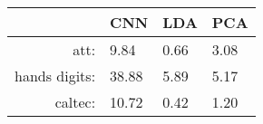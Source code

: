 \begin{tabular}{|r|l|l|l|}
  \hline
    & CNN & LDA & PCA \\
  \hline
  att: & 9.84 & 0.66 & 3.08 \\
  \hline
  hands digits: & 38.88 & 5.89 & 5.17 \\
  \hline
  caltec: & 10.72 & 0.42 & 1.20 \\
  \hline
\end{tabular}
